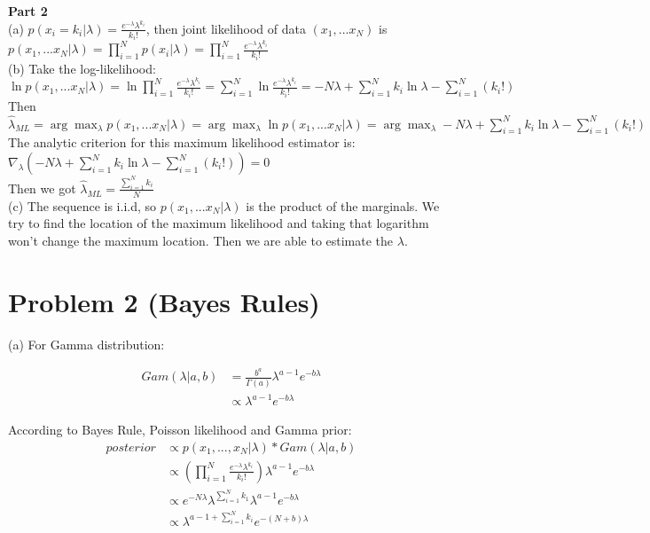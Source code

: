 \documentclass[paper=a4, fontsize=11pt]{scrartcl} %
\numberwithin{equation}{section} %
\numberwithin{figure}{section} %
\numberwithin{table}{section} %
\begin{document}

\textbf{Part 2} \\

(a) $ p(x_i=k_i|\lambda) = \frac{e^{-\lambda}\lambda^{k_i}}{k_i!} $, then joint likelihood of data $ (x_1,...x_N) $ is $ p(x_1,...x_N|\lambda) = \prod_{i=1}^{N} p(x_i|\lambda) = \prod_{i=1}^{N} \frac{e^{-\lambda}\lambda^{k_i}}{k_i!}$ \\

(b) Take the log-likelihood: $ \ln p(x_1,...x_N|\lambda) = \ln \prod_{i=1}^{N} \frac{e^{-\lambda}\lambda^{k_i}}{k_i!} = \sum_{i=1}^{N}\ln \frac{e^{-\lambda}\lambda^{k_i}}{k_i!} = -N\lambda+\sum_{i=1}^{N}k_i \ln\lambda - \sum_{i=1}^{N}(k_i!)$ \\
Then $ \hat{\lambda}_{ML} = \arg\max_{\lambda} p(x_1,...x_N|\lambda) =  \arg\max_{\lambda} \ln p(x_1,...x_N|\lambda) = \arg\max_{\lambda}  -N\lambda+\sum_{i=1}^{N}k_i \ln\lambda - \sum_{i=1}^{N}(k_i!)$ \\
The analytic criterion for this maximum likelihood estimator is: $ \nabla_\lambda (-N\lambda+\sum_{i=1}^{N}k_i \ln\lambda - \sum_{i=1}^{N}(k_i!)) = 0 $ \\
Then we got $ \hat{\lambda}_{ML} = \frac{\sum_{i=1}^{N}k_i}{N} $ \\

(c) The sequence is i.i.d, so $ p(x_1,...x_N|\lambda) $ is the product of the marginals. We try to find the location of the maximum likelihood and taking that logarithm won't change the maximum location. Then we are able to estimate the $\lambda$. \\


\section{Problem 2 (Bayes Rules)}

(a) For Gamma distribution: 

\begin{align*}
Gam(\lambda|a,b) & = \frac{b^a}{\Gamma(a)}\lambda^{a-1}e^{-b\lambda} \\
& \propto \lambda^{a-1}e^{-b\lambda} 
\end{align*}	

According to Bayes Rule, Poisson likelihood and Gamma prior: 
\begin{align*}
posterior & \propto p(x_1,...,x_N|\lambda)*Gam(\lambda|a,b) \\
& \propto (\prod_{i=1}^{N} \frac{e^{-\lambda}\lambda^{k_i}}{k_i!})\lambda^{a-1}e^{-b\lambda} \\
& \propto e^{-N\lambda}\lambda^{\sum_{i=1}^{N}k_1}\lambda^{a-1}e^{-b\lambda} \\
& \propto \lambda^{a-1+\sum_{i=1}^{N}k_i}e^{-(N+b)\lambda}
\end{align*}
\end{document}
